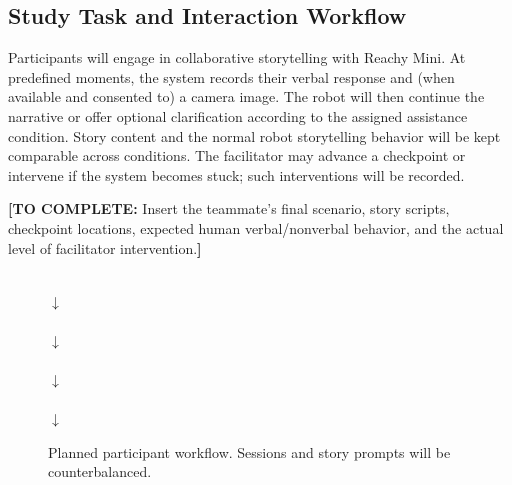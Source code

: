 \documentclass[conference]{IEEEtran}
\newcommand{\drafttodo}[1]{\par\smallskip\noindent\textcolor{red!65!black}{\textbf{[TO COMPLETE:} #1\textbf{]}}\par\smallskip}
\begin{document}
\subsection{Study Task and Interaction Workflow}
Participants will engage in collaborative storytelling with Reachy Mini. At predefined moments, the system records their verbal response and (when available and consented to) a camera image. The robot will then continue the narrative or offer optional clarification according to the assigned assistance condition. Story content and the normal robot storytelling behavior will be kept comparable across conditions. The facilitator may advance a checkpoint or intervene if the system becomes stuck; such interventions will be recorded.

\drafttodo{Insert the teammate's final scenario, story scripts, checkpoint locations, expected human verbal/nonverbal behavior, and the actual level of facilitator intervention.}

\begin{figure}[htbp]
\centering
{}\\[5pt]
$\downarrow$\\[3pt]
\\[5pt]
$\downarrow$\\[3pt]
\\[5pt]
$\downarrow$\\[3pt]
\\[5pt]
$\downarrow$\\[3pt]
\caption{Planned participant workflow. Sessions and story prompts will be counterbalanced.}
\label{fig:workflow}
\end{figure}
\end{document}
